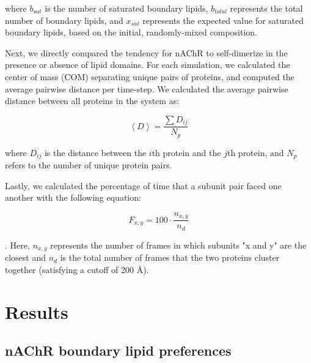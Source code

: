 where $b_{sat}$ is the number of saturated boundary lipids, $b_{total}$ represents the total number of boundary lipids, and $x_{sat}$ represents the expected value for saturated boundary lipids, based on the initial, randomly-mixed composition.   



  

Next, we directly compared the tendency for nAChR to self-dimerize in the presence or absence of lipid domains. For each simulation, we calculated the center of mass (COM) separating unique pairs of proteins, and computed the average pairwise distance per time-step. We calculated the average pairwise distance between all proteins in the system as:    


\begin{equation}\label{eq:dimer}
\left\langle D \right\rangle = \frac{\sum D_{ij}}{N_{p}}
\end{equation}

where $D_{ij}$ is the distance between the $i$th protein and the $j$th protein, and $N_{p}$ refers to the number of unique protein pairs. 



Lastly, we calculated the percentage of time that a subunit pair faced one another with the following equation: 

\begin{equation}\label{eq:subunit}
F_{x,y} = 100\cdot \frac{n_{x,y}}{n_d}
\end{equation}

. Here, $n_{x,y}$ represents the number of frames in which subunits "x and y" are the closest and $n_d$ is the total number of frames that the two proteins cluster together (satisfying a cutoff of 200 {\AA}).

\section{Results}

\subsection{nAChR boundary lipid preferences}\label{sec:lipids}

